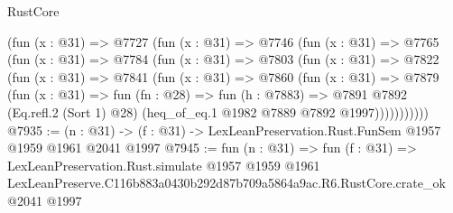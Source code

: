 \begin{lexlean}{RustCore}
\begin{coremodule}
    (fun (x : @31) =>
    @7727
      (fun (x : @31) =>
      @7746
        (fun (x : @31) =>
        @7765
          (fun (x : @31) =>
          @7784
            (fun (x : @31) =>
            @7803
              (fun (x : @31) =>
              @7822
                (fun (x : @31) =>
                @7841
                  (fun (x : @31) =>
                  @7860
                    (fun (x : @31) =>
                    @7879
                      (fun (x : @31) =>
                      fun (fn : @28) =>
                      fun (h : @7883) =>
                      @7891
                        @7892
                        (Eq.refl.{2} (Sort 1) @28)
                        (heq_of_eq.{1} @1982 @7889 @7892 @1997)))))))))))
@7935 := (n : @31) -> (f : @31) -> LexLeanPreservation.Rust.FunSem @1957 @1959 @1961 @2041 @1997
@7945 := fun (n : @31) =>
  fun (f : @31) =>
  LexLeanPreservation.Rust.simulate
    @1957
    @1959
    @1961
    LexLeanPreserve.C116b883a0430b292d87b709a5864a9ac.R6.RustCore.crate_ok
    @2041
    @1997
\end{coremodule}
\end{lexlean}
